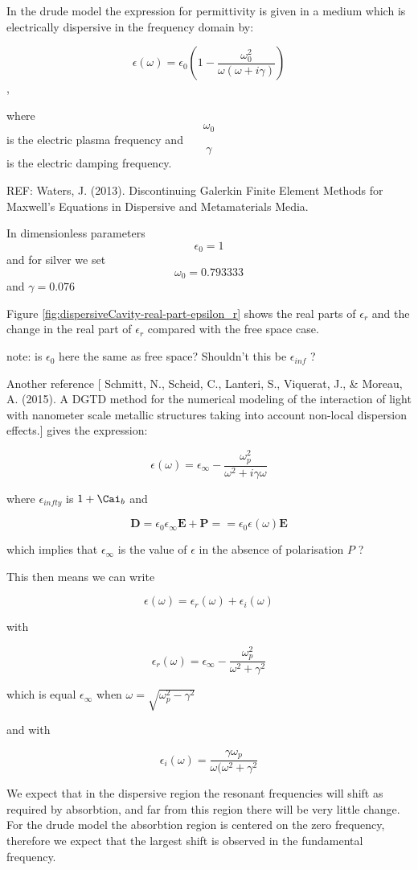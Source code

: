 In the drude model the expression for permittivity is given in a medium which is electrically dispersive in the frequency domain by:

$$
\epsilon(\omega) = \epsilon_0 ( 1 - \frac{\omega_0^2}{\omega(\omega + i \gamma )})
$$,

where $$\omega_0$$ is the electric plasma frequency and $$\gamma$$ is the electric damping frequency.

REF: Waters, J. (2013). Discontinuing Galerkin Finite Element Methods for Maxwell's Equations in Dispersive and Metamaterials Media.

In dimensionless parameters $$\epsilon_0 = 1$$ and for silver we set $$\omega_0 = 0.793333$$ and $\gamma = 0.076$

Figure \ref{fig:dispersiveCavity-real-part-epsilon_r} shows the real parts of $\epsilon_r$ and the change in the real part of $\epsilon_r$ compared with the free space case.

note: is $\epsilon_0$ here the same as free space? Shouldn't this be $\epsilon_{inf}$ ?


Another reference [ Schmitt, N., Scheid, C., Lanteri, S., Viquerat, J., & Moreau, A. (2015). A DGTD method for the numerical modeling of the interaction of light with nanometer scale metallic structures taking into account non-local dispersion effects.] gives the expression:

$$
\epsilon(\omega) = \epsilon_{\infty} - \frac{\omega_p^2}{\omega^2 + i \gamma \omega}
$$

where $\epsilon_{infty}$ is $ 1 + \Cai_b $ and

$$
\mathbf{D} = \epsilon_0 \epsilon_{\infty} \mathbf{E} + \mathbf{P} == \epsilon_0 \epsilon(\omega) \mathbf{E}
$$

which implies that $\epsilon_{\infty}$ is the value of $\epsilon$ in the absence of polarisation $P$ ?

This then means we can write

$$
\epsilon(\omega) = \epsilon_r(\omega) + \epsilon_i (\omega)
$$

with

$$
\epsilon_r(\omega) = \epsilon_{\infty} - \frac{\omega_p^2 }{\omega^2 + \gamma^2}
$$

which is equal $\epsilon_{\infty}$ when $\omega = \sqrt{ \omega_p^2 - \gamma^2 }$

and with

$$
\epsilon_i(\omega) = \frac{\gamma \omega_p}{\omega(\omega^2 + \gamma^2}
$$

We expect that in the dispersive region the resonant frequencies will shift as required by absorbtion, and far from this region there will be very little change. For the drude model the absorbtion region is centered on the zero frequency, therefore we expect that the largest shift is observed in the fundamental frequency.

